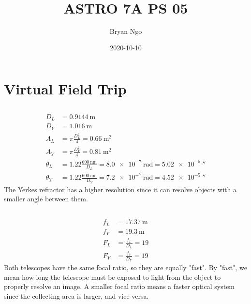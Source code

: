 \documentclass{article}
\title{ASTRO 7A PS 05}
\author{Bryan Ngo}
\date{2020-10-10}
\begin{document}
\maketitle

\section{Virtual Field Trip}

\subsection{}

\begin{align}
    D_L &= \SI{0.9144}{\meter} \\
    D_Y &= \SI{1.016}{\meter} \\
    A_L &= \pi \frac{D_L^2}{4} = \SI{0.66}{\meter\squared} \\
    A_Y &= \pi \frac{D_Y^2}{4} = \SI{0.81}{\meter\squared} \\
    \theta_L &= 1.22 \frac{\SI{600}{\nano\meter}}{D_L} = \SI{8.0e-7}{\radian} = \SI{5.02e-5}{\arcsecond} \\
    \theta_Y &= 1.22 \frac{\SI{600}{\nano\meter}}{D_Y} = \SI{7.2e-7}{\radian} = \SI{4.52e-5}{\arcsecond}
\end{align}
The Yerkes refractor has a higher resolution since it can resolve objects with a smaller angle between them.

\subsection{}

\begin{align}
    f_L &= \SI{17.37}{\meter} \\
    f_Y &= \SI{19.3}{\meter} \\
    F_L &= \frac{f_L}{D_L} = \num{19} \\
    F_Y &= \frac{f_Y}{D_Y} = \num{19}
\end{align}
Both telescopes have the same focal ratio, so they are equally "fast".
By "fast", we mean how long the telescope must be exposed to light from the object to properly resolve an image.
A smaller focal ratio means a faster optical system since the collecting area is larger, and vice versa.

\subsection{}
\end{document}
